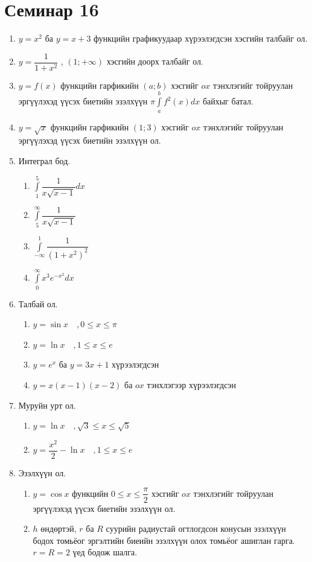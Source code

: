 \section{Семинар 16}
\begin{enumerate}
    \item $y=x^2$ ба $y=x+3$ функцийн графикуудаар хүрээлэгдсэн хэсгийн талбайг ол.
    \item $y=\dfrac{1}{1+x^2}$ , $(1;+\infty)$  хэсгийн доорх талбайг ол.
    \item $y=f(x)$ функцийн гарфикийн $(a;b)$ хэсгийг $ox$ тэнхлэгийг тойруулан эргүүлэхэд үүсэх биетийн эзэлхүүн $\displaystyle\pi\int\limits_a^b f^2(x) dx$ байхыг батал.
    \item $y=\sqrt{x}$  функцийн гарфикийн $(1;3)$ хэсгийг $ox$ тэнхлэгийг тойруулан эргүүлэхэд үүсэх биетийн эзэлхүүн ол.
    \item Интеграл бод. 
    \begin{enumerate}
        \item $\displaystyle\int\limits_1^5\dfrac{1}{x\sqrt{x-1}} dx$
        \item $\displaystyle\int\limits_5^{\infty}\dfrac{1}{x\sqrt{x-1}}$
        \item $\displaystyle\int\limits_{-\infty}^1\dfrac{1}{(1+x^2)^2}$
        \item $\displaystyle\int\limits_0^{\infty}x^3e^{-x^2}dx$
    \end{enumerate}
    \item Талбай ол.
    \begin{enumerate}
        \item $y=\sin x\quad , 0\leq x\leq \pi$
        \item $y=\ln x \quad , 1\leq x\leq e$
        \item $y=e^x$ ба $y=3x+1$ хүрээлэгдсэн
        \item $y=x(x-1)(x-2)$ ба $ox$ тэнхлэгээр хүрээлэгдсэн
    \end{enumerate}
    \item  Муруйн урт ол.
    \begin{enumerate}
        \item $y=\ln x\quad , \sqrt{3}\leq x\leq \sqrt{5}$
        \item $y=\dfrac{x^2}{2}-\ln x \quad , 1\leq x\leq e$
    \end{enumerate}
     \item  Эзэлхүүн ол.
    \begin{enumerate}
        \item $y=\cos x$ функцийн $ 0\leq x\leq \dfrac{\pi}{2}$ хэсгийг $ox$ тэнхлэгийг тойруулан эргүүлэхэд үүсэх биетийн эзэлхүүн ол.
        \item $h$ өндөртэй, $r$ ба $R$ суурийн радиустай огтлогдсон конусын эзэлхүүн бодох томьёог эргэлтийн биеийн эзэлхүүн олох томьёог ашиглан гарга. $r=R=2$ үед бодож шалга.
    \end{enumerate}
\end{enumerate}